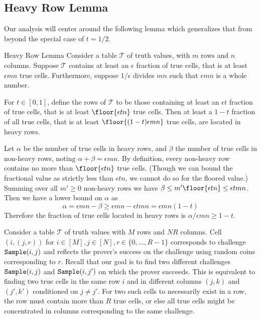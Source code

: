 \subsection{Heavy Row Lemma}

Our analysis will center around the following lemma which generalizes that from \cite{Dam10} beyond the special case of $t=1/2$.

\begin{lemma}{Heavy Row Lemma}
    Consider a table $\mathcal{T}$ of truth values, with $m$ rows and $n$ columns.
    Suppose $\mathcal{T}$ contains at least an $\epsilon$ fraction of true cells, that is at least $\epsilon mn$ true cells.
    Furthermore, suppose $1/\epsilon$ divides $mn$ such that $\epsilon mn$ is a whole number.

    For $t\in[0,1]$, define the  rows of $\mathcal{T}$ to be those containing at least an $\epsilon t$ fraction of true cells, that is at least $\floor{\epsilon tn}$ true cells.
    Then at least a $1-t$ fraction of all true cells, that is at least $\floor{(1-t)\epsilon mn}$ true cells, are located in heavy rows. 

    \proof
    Let $\alpha$ be the number of true cells in heavy rows, and $\beta$ the number of true cells in non-heavy rows, noting $\alpha+\beta=\epsilon mn$.
    By definition, every non-heavy row contains no more than $\floor{\epsilon tn}$ true cells. (Though we can bound the fractional value as strictly less than $\epsilon tn$, we cannot do so for the floored value.)
    Summing over all $m'\geq 0$ non-heavy rows we have $\beta \leq m'\floor{\epsilon tn} \leq \epsilon tmn$.
    Then we have a lower bound on $\alpha$ as
    \begin{equation}
        \alpha = \epsilon mn - \beta \geq \epsilon mn - \epsilon tmn = \epsilon mn(1-t)
    \end{equation}
    Therefore the fraction of true cells located in heavy rows is $\alpha/\epsilon mn \geq 1-t$.
\end{lemma}

Consider a table $\mathcal{T}$ of truth values with $M$ rows and $NR$ columns.
Cell $(i,(j,r))$ for $i\in[M], j\in[N], r\in\{0,\dots,R-1\}$ corresponds to challenge $\mathtt{Sample}(i,j)$ and reflects the prover's success on the challenge using random coins corresponding to $r$.
Recall that our goal is to find two different challenges $\mathtt{Sample}(i,j)$ and $\mathtt{Sample}(i,j')$ on which the prover succeeds.
This is equivalent to finding two true cells in the same row $i$ and in different columns $(j,k)$ and $(j',k')$ conditioned on $j\neq j'$.
For two such cells to necessarily exist in a row, the row must contain more than $R$ true cells, or else all true cells might be concentrated in columns corresponding to the same challenge.

